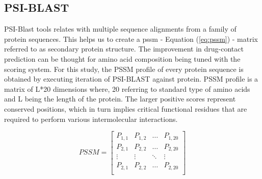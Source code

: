   \subsection{PSI-BLAST}
  PSI-Blast tools relates with multiple sequence alignments from a family of protein sequences\cite{Schaffer2001}. This helps us to create a \acrshort{pssm} - Equation (\ref{eq:pssm}) - matrix referred to as secondary protein structure. The improvement in drug-contact prediction can be thought for amino acid composition being tuned with the scoring system. For this study, the PSSM profile of every protein sequence is obtained by executing iteration of PSI-BLAST against \cite[KEGG]{Schaffer2001} protein. PSSM profile is a matrix of L*20 dimensions where, 20 referring to standard type of amino acids and L being the length of the protein. The larger positive scores represent conserved positions, which in turn implies critical functional residues that are required to perform various intermolecular interactions.\cite[PSSM]{Schaffer2001}
  
  \begin{equation}
    PSSM = \begin{bmatrix}
      P_{1,1} & P_{1,2} & \dots & P_{1,20} \\
      P_{2,1} & P_{2,2} & \dots & P_{2,20} \\
      \vdots  & \vdots  & \ddots & \vdots \\
      P_{2,1} & P_{2,2} & \dots & P_{2,20} \\
    \end{bmatrix}
    \label{eq:pssm}
  \end{equation}
  
